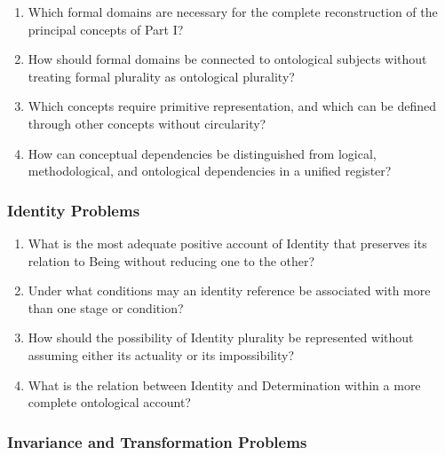 \begin{enumerate}
    \item Which formal
    domains are
    necessary for
    the complete
    reconstruction of
    the principal
    concepts of
    Part I?

    \item How should
    formal domains
    be connected
    to ontological
    subjects without
    treating formal
    plurality as
    ontological plurality?

    \item Which concepts
    require primitive
    representation,
    and which
    can be
    defined through
    other concepts
    without circularity?

    \item How can
    conceptual dependencies
    be distinguished
    from logical,
    methodological, and
    ontological dependencies
    in a
    unified register?
\end{enumerate}

\subsubsection{Identity Problems}

\begin{enumerate}
    \item What is
    the most
    adequate positive
    account of
    Identity that
    preserves its
    relation to
    Being without
    reducing one
    to the
    other?

    \item Under what
    conditions may
    an identity
    reference be
    associated with
    more than
    one stage
    or condition?

    \item How should
    the possibility
    of Identity
    plurality be
    represented without
    assuming either
    its actuality
    or its
    impossibility?

    \item What is
    the relation
    between Identity
    and Determination
    within a
    more complete
    ontological account?
\end{enumerate}

\subsubsection{Invariance and Transformation Problems}

